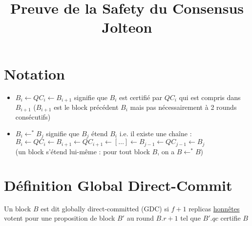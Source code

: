\documentclass{article}
\title{Preuve de la Safety du Consensus Jolteon}
\author{}
\date{}
\begin{document}
\maketitle
\vspace{-3\baselineskip}

\section*{Notation}
\begin{itemize}
    \item \(B_i \leftarrow QC_i \leftarrow B_{i+1}\) signifie que \(B_i\) est certifié par \(QC_i\) qui est compris dans \(B_{i+1}\) (\(B_{i+1}\) est le block précédent \(B_i\) mais pas nécessairement à 2 rounds consécutifs)
    \item \(B_i \leftarrow^* B_j\) signifie que \(B_j\) étend \(B_i\) i.e. il existe une chaîne :\\ \(B_i \leftarrow QC_i \leftarrow B_{i+1} \leftarrow QC_{i+1} \leftarrow [\ldots] \leftarrow B_{j-1} \leftarrow QC_{j-1} \leftarrow B_j\) \\(un block s'étend lui-même : pour tout block \(B\), on a \(B \leftarrow^* B\))
\end{itemize}

\section*{Définition Global Direct-Commit}
Un block \(B\) est dit globally direct-committed (GDC) si \(f+1\) replicas \underline{honnêtes} votent pour une proposition de block \(B'\) au round \(B.r + 1\) tel que \(B'.qc\) certifie \(B\)
\end{document}
